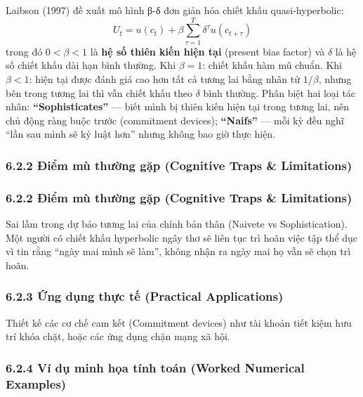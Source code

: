 \documentclass[
]{article}
\begin{document}
Laibson (1997) đề xuất mô hình β-δ đơn giản hóa chiết khấu
quasi-hyperbolic:
\[ U_t = u(c_t) + \beta \sum_{\tau=1}^{T} \delta^\tau u(c_{t+\tau}) \]
trong đó \(0 < \beta < 1\) là \textbf{hệ số thiên kiến hiện tại}
(present bias factor) và \(\delta\) là hệ số chiết khấu dài hạn bình
thường. Khi \(\beta = 1\): chiết khấu hàm mũ chuẩn. Khi \(\beta < 1\):
hiện tại được đánh giá cao hơn tất cả tương lai bằng nhân tử
\(1/\beta\), nhưng bên trong tương lai thì vẫn chiết khấu theo
\(\delta\) bình thường. Phân biệt hai loại tác nhân:
\textbf{``Sophisticates''} --- biết mình bị thiên kiến hiện tại trong
tương lai, nên chủ động ràng buộc trước (commitment devices);
\textbf{``Naifs''} --- mỗi kỳ đều nghĩ ``lần sau mình sẽ kỷ luật hơn''
nhưng không bao giờ thực hiện.

\subsubsection{6.2.2 Điểm mù thường gặp (Cognitive Traps \&
Limitations)}\label{ux111iux1ec3m-muxf9-thux1b0ux1eddng-gux1eb7p-cognitive-traps-limitations-17}

\subsubsection{6.2.2 Điểm mù thường gặp (Cognitive Traps \&
Limitations)}\label{ux111iux1ec3m-muxf9-thux1b0ux1eddng-gux1eb7p-cognitive-traps-limitations-18}

Sai lầm trong dự báo tương lai của chính bản thân (Naivete vs
Sophistication). Một người có chiết khấu hyperbolic ngây thơ sẽ liên tục
trì hoãn việc tập thể dục vì tin rằng ``ngày mai mình sẽ làm'', không
nhận ra ngày mai họ vẫn sẽ chọn trì hoãn.

\subsubsection{6.2.3 Ứng dụng thực tế (Practical
Applications)}\label{ux1ee9ng-dux1ee5ng-thux1ef1c-tux1ebf-practical-applications-10}

Thiết kế các cơ chế cam kết (Commitment devices) như tài khoản tiết kiệm
hưu trí khóa chặt, hoặc các ứng dụng chặn mạng xã hội.

\subsubsection{6.2.4 Ví dụ minh họa tính toán (Worked Numerical
Examples)}\label{vuxed-dux1ee5-minh-hux1ecda-tuxednh-touxe1n-worked-numerical-examples-9}
\end{document}
